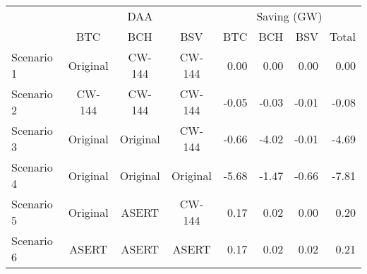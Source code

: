 
\begin{tabular}[t]{lcccrrrr}
\toprule
\multicolumn{1}{c}{ } & \multicolumn{3}{c}{DAA} & \multicolumn{4}{c}{Saving (GW)} \\
\cmidrule(l{3pt}r{3pt}){2-4} \cmidrule(l{3pt}r{3pt}){5-8}
 & BTC & BCH & BSV & BTC & BCH & BSV & Total\\
\midrule
Scenario 1 & Original & CW-144 & CW-144 & 0.00 & 0.00 & 0.00 & 0.00\\
Scenario 2 & CW-144 & CW-144 & CW-144 & -0.05 & -0.03 & -0.01 & -0.08\\
Scenario 3 & Original & Original & CW-144 & -0.66 & -4.02 & -0.01 & -4.69\\
Scenario 4 & Original & Original & Original & -5.68 & -1.47 & -0.66 & -7.81\\
Scenario 5 & Original & ASERT & CW-144 & 0.17 & 0.02 & 0.00 & 0.20\\
Scenario 6 & ASERT & ASERT & ASERT & 0.17 & 0.02 & 0.02 & 0.21\\
\bottomrule
\end{tabular}
